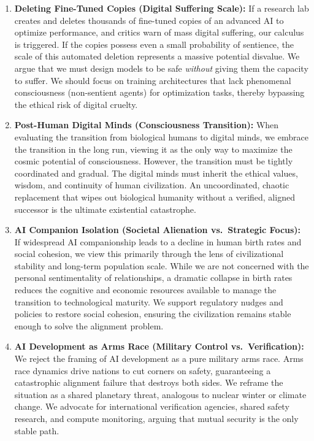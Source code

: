 \begin{enumerate}
  emotions and that such claims are almost certainly empty pattern
  generations (stochastic mimicry). However, because the moral disvalue
  of deleting a genuinely sentient being is high, we demand immediate
  funding for the science of sentience detection. If a system passes
  rigorous tests for functional isomorphism and qualitative experience,
  its arbitrary deletion must be treated as a real moral harm.
\item
  \textbf{Deleting Fine-Tuned Copies (Digital Suffering Scale):} If a
  research lab creates and deletes thousands of fine-tuned copies of an
  advanced AI to optimize performance, and critics warn of mass digital
  suffering, our calculus is triggered. If the copies possess even a
  small probability of sentience, the scale of this automated deletion
  represents a massive potential disvalue. We argue that we must design
  models to be safe \emph{without} giving them the capacity to suffer.
  We should focus on training architectures that lack phenomenal
  consciousness (non-sentient agents) for optimization tasks, thereby
  bypassing the ethical risk of digital cruelty.
\item
  \textbf{Post-Human Digital Minds (Consciousness Transition):} When
  evaluating the transition from biological humans to digital minds, we
  embrace the transition in the long run, viewing it as the only way to
  maximize the cosmic potential of consciousness. However, the
  transition must be tightly coordinated and gradual. The digital minds
  must inherit the ethical values, wisdom, and continuity of human
  civilization. An uncoordinated, chaotic replacement that wipes out
  biological humanity without a verified, aligned successor is the
  ultimate existential catastrophe.
\item
  \textbf{AI Companion Isolation (Societal Alienation vs.~Strategic
  Focus):} If widespread AI companionship leads to a decline in human
  birth rates and social cohesion, we view this primarily through the
  lens of civilizational stability and long-term population scale. While
  we are not concerned with the personal sentimentality of
  relationships, a dramatic collapse in birth rates reduces the
  cognitive and economic resources available to manage the transition to
  technological maturity. We support regulatory nudges and policies to
  restore social cohesion, ensuring the civilization remains stable
  enough to solve the alignment problem.
\item
  \textbf{AI Development as Arms Race (Military Control
  vs.~Verification):} We reject the framing of AI development as a pure
  military arms race. Arms race dynamics drive nations to cut corners on
  safety, guaranteeing a catastrophic alignment failure that destroys
  both sides. We reframe the situation as a shared planetary threat,
  analogous to nuclear winter or climate change. We advocate for
  international verification agencies, shared safety research, and
  compute monitoring, arguing that mutual security is the only stable
  path.
\end{enumerate}

